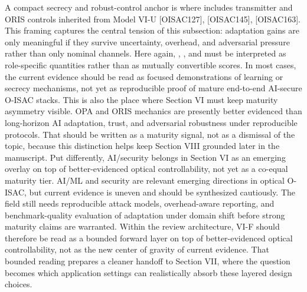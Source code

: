 {}A compact secrecy and robust-control anchor is\markdownRendererParagraphSeparator
{}\markdownRendererSoftLineBreak
{}\markdownRendererSoftLineBreak
{}\markdownRendererParagraphSeparator
{}where  includes transmitter and ORIS controls inherited from Model VI-U [O\markdownRendererUnderscore{}ISAC\markdownRendererUnderscore{}127], [O\markdownRendererUnderscore{}ISAC\markdownRendererUnderscore{}145], [O\markdownRendererUnderscore{}ISAC\markdownRendererUnderscore{}163]. This framing captures the central tension of this subsection: adaptation gains are only meaningful if they survive uncertainty, overhead, and adversarial pressure rather than only nominal channels. Here again, , , and  must be interpreted as role-specific quantities rather than as mutually convertible scores. In most cases, the current evidence should be read as focused demonstrations of learning or secrecy mechanisms, not yet as reproducible proof of mature end-to-end AI-secure O-ISAC stacks.\markdownRendererParagraphSeparator
{}This is also the place where Section VI must keep maturity asymmetry visible. OPA and ORIS mechanics are presently better evidenced than long-horizon AI adaptation, trust, and adversarial robustness under reproducible protocols. That should be written as a maturity signal, not as a dismissal of the topic, because this distinction helps keep Section VIII grounded later in the manuscript. Put differently, AI/security belongs in Section VI as an emerging overlay on top of better-evidenced optical controllability, not yet as a co-equal maturity tier.\markdownRendererParagraphSeparator
{} AI/ML and security are relevant emerging directions in optical O-ISAC, but current evidence is uneven and should be synthesized cautiously. The field still needs reproducible attack models, overhead-aware reporting, and benchmark-quality evaluation of adaptation under domain shift before strong maturity claims are warranted. Within the review architecture, VI-F should therefore be read as a bounded forward layer on top of better-evidenced optical controllability, not as the new center of gravity of current evidence. That bounded reading prepares a cleaner handoff to Section VII, where the question becomes which application settings can realistically absorb these layered design choices.\markdownRendererInterblockSeparator
